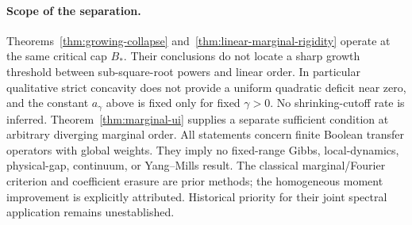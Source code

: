 \documentclass[11pt]{article}
\begin{document}
\paragraph{Scope of the separation.}
Theorems~\ref{thm:growing-collapse} and~\ref{thm:linear-marginal-rigidity}
operate at the same critical cap $B_*$. Their conclusions do not locate a
sharp growth threshold between sub-square-root powers and linear order.
In particular qualitative strict concavity does not provide a uniform
quadratic deficit near zero, and the constant $a_\gamma$ above is fixed
only for fixed $\gamma>0$. No shrinking-cutoff rate is inferred.
Theorem~\ref{thm:marginal-ui} supplies a separate sufficient condition at
arbitrary diverging marginal order. All statements concern finite Boolean
transfer operators with global weights. They imply no fixed-range Gibbs,
local-dynamics, physical-gap, continuum, or Yang--Mills result.
The classical marginal/Fourier criterion and coefficient erasure are prior
methods; the homogeneous moment improvement is explicitly attributed.
Historical priority for their joint spectral application remains unestablished.
\end{document}
